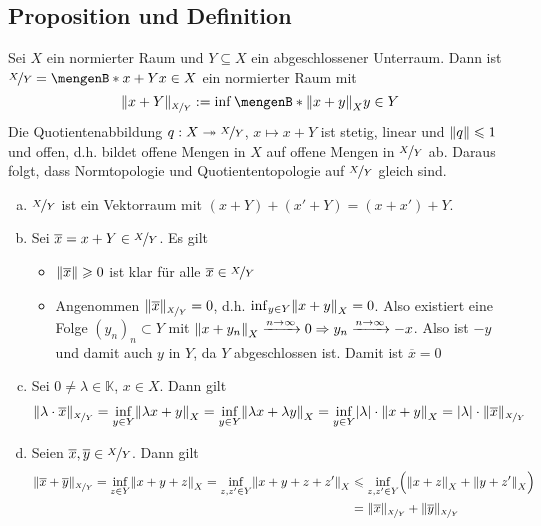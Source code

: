 \subsection[Proposition und Definition: Norm auf dem Quotientenraum]{Proposition und Definition} %
\label{sub:213}
Sei $X$ ein normierter Raum und $Y \subseteq X$ ein abgeschlossener Unterraum. Dann ist $\nicefrac{X}{Y} = \set[x +Y]{x \in X}$ ein normierter Raum mit
\[
	\norm[\nicefrac{X}{Y}]{x +Y} := \inf \set[{\norm[X]{x+y} }]{y \in Y}  
\]
Die Quotientenabbildung $q : X \twoheadrightarrow \nicefrac{X}{Y}$, $x \mapsto x+ Y$ ist stetig, linear und $\norm{q} \le 1$ und offen, d.h. bildet offene Mengen in $X$ auf offene Mengen in $\nicefrac{X}{Y}$ ab.
Daraus folgt, dass Normtopologie und Quotiententopologie auf $\nicefrac{X}{Y}$ gleich sind.
\begin{enumerate}[a)]
	\item $\nicefrac{X}{Y}$ ist ein Vektorraum mit $(x+Y) + (x'+Y) = (x+x') + Y$.
	\item Sei $\overline{x} = x+ Y \in \nicefrac{X}{Y}$. Es gilt
	\begin{itemize}
		\item $\norm{\overline{x}} \ge 0 $ ist klar für alle $\overline{x} \in \nicefrac{X}{Y}$
		\item Angenommen $\norm[\nicefrac{X}{Y}]{\overline{x}} =0$, d.h. $\inf_{y \in Y} \norm[X]{x+y} =0$. Also existiert eine Folge $(y_n)_n \subset Y$ mit
		$\norm[X]{x+y_n} \xrightarrow{n \to \infty} 0 \Rightarrow y_n \xrightarrow{n \to \infty} -x$. Also ist $-y$ und damit auch $y$ in $Y$, da $Y$ abgeschlossen ist.
		Damit ist $\overline{x}=0 $ 
	\end{itemize}
	\item Sei $0 \not= \lambda \in \mathds{K}$, $x \in X$. Dann gilt
	\begin{align*}
		\norm[\nicefrac{X}{Y}]{\lambda \cdot \overline{x}} = \inf_{y \in Y} \norm[X]{\lambda x + y} = \inf_{y \in Y} \norm[X]{\lambda x + \lambda y} 
		= \inf_{y \in Y} \abs*{\lambda } \cdot \norm[X]{x+y}  =   \abs*{\lambda } \cdot \norm[\nicefrac{X}{Y}]{\overline{x}}  
	\end{align*}
	\item Seien $\overline{x}, \overline{y} \in \nicefrac{X}{Y}$. Dann gilt
	\begin{align*}
		\norm[\nicefrac{X}{Y}]{\overline{x} + \overline{y}} = \inf_{z \in Y} \norm[X]{x+y+z} = \inf_{z,z' \in Y} \norm[X]{x+y+z+z'} &\le \inf_{z,z' \in Y}
		\enbrace[\Big]{\norm[X]{x+z} + \norm[X]{y+z'}} \\ &= \norm[\nicefrac{X}{Y}]{\overline{x}} + \norm[\nicefrac{X}{Y}]{\overline{y}}

\end{align*}
\end{enumerate}
